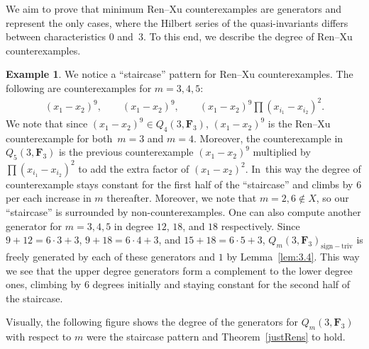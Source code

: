 \documentclass[pdftex]{sigma}
\theoremstyle{definition}
\newtheorem{Example}[Theorem]{Example}
\numberwithin{equation}{section}
\newcommand{\siv}{\mathrm{sign-triv}}
\begin{document}
We aim to prove that minimum Ren--Xu counterexamples are generators and represent the only cases, where the Hilbert series of the quasi-invariants differs between characteristics $0$ and~$3$. To this end, we describe the degree of Ren--Xu counterexamples.

\begin{Example}
 We notice a ``staircase'' pattern for Ren--Xu counterexamples. The following are counterexamples for $m=3,4,5$:
 \begin{gather*}
 (x_1-x_2)^9, \qquad (x_1-x_2)^9,\qquad
 (x_1-x_2)^9\prod (x_{i_1}-x_{i_2})^2.
 \end{gather*}
 We note that since $(x_1-x_2)^9\in Q_4(3,\mathbf{F}_3)$, $(x_1-x_2)^9$ is the Ren--Xu counterexample for both~${m=3}$ and $m=4$. Moreover, the counterexample in $Q_5(3,\mathbf{F}_3)$ is the previous counterexample $(x_1-x_2)^9$ multiplied by $\prod (x_{i_1}-x_{i_2})^2$ to add the extra factor of $(x_1-x_2)^2$. In~this way the degree of counterexample stays constant for the first half of the ``staircase'' and climbs by $6$ per each increase in $m$ thereafter. Moreover, we note that $m=2,6\not\in X$, so our ``staircase'' is surrounded by non-counterexamples. One can also compute another generator for $m=3, 4, 5$ in degree $12$, $18$, and $18$ respectively. Since $9+12=6\cdot 3+3$, $9+18=6\cdot 4+3$, and $15+18=6\cdot 5 +3$, $Q_m(3,\mathbf{F}_3)_{\siv}$ is freely generated by each of these generators and $1$ by Lemma~\ref{lem:3.4}. This way we see that the upper degree generators form a complement to the lower degree ones, climbing by $6$ degrees initially and staying constant for the second half of the staircase.

 Visually, the following figure shows the degree of the generators for $Q_m(3,\mathbf{F}_3)$ with respect to $m$ were the staircase pattern and Theorem~\ref{justRens} to hold.
 \begin{figure}[ht]%
 \centering
\end{figure}
\end{Example}
\end{document}
